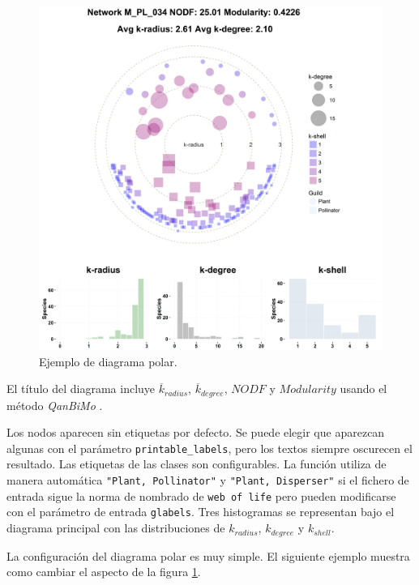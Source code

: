 \begin{figure}[h!]
\centering
\includegraphics[scale=0.43]{ManFigs/M_PL_034_polar.png}
\caption {Ejemplo de diagrama polar.}
\label{fig:AKMAN_M_PL_034_polar}
\end{figure}

El título del diagrama incluye $\overline{k}_{radius}$, $\overline {k}_{degree}$, $NODF$ \cite{almeida2008consistent} y $Modularity$ usando el método \textit{QanBiMo} \cite{dormann2014method}.

Los nodos aparecen sin etiquetas por defecto. Se puede elegir que aparezcan algunas con el parámetro \texttt{printable\_labels}, pero los textos siempre oscurecen el resultado. Las etiquetas de las clases son configurables. La función utiliza de manera automática \texttt{"Plant, Pollinator"} y \texttt{"Plant, Disperser"} si el fichero de entrada sigue la norma de nombrado de \texttt{web of life} pero pueden modificarse con el parámetro de entrada \texttt{glabels}. Tres histogramas se representan bajo el diagrama principal con las distribuciones de $k_{radius}$, $k_{degree}$ y $k_{shell}$. 

La configuración del diagrama polar es muy simple. El siguiente ejemplo muestra como cambiar el aspecto de la figura \ref{fig:AKMAN_M_PL_034_polar}.

